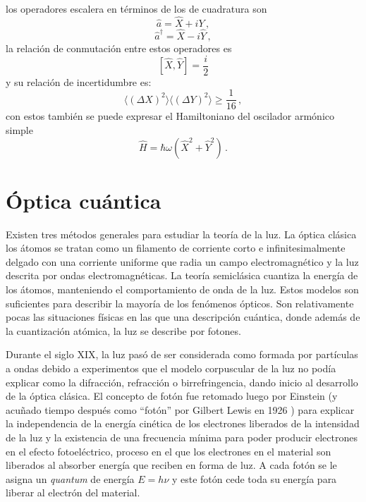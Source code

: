 los operadores escalera en términos de los de cuadratura son
\begin{equation}
  \label{OA.25}
  \hat{a} = \hat{X} + i{Y}\,,
\end{equation}
\begin{equation}
  \label{OA.26}
  \hat{a}^{\dagger} = \hat{X} - i\hat{Y}\,,
\end{equation}
la relación de conmutación entre estos operadores es
\begin{equation}
  \label{OA.27}
  \left[ \hat{X}, \hat{Y} \right] = \frac{i}{2}
\end{equation}
y su relación de incertidumbre es:
\begin{equation}
  \label{OA.28}
  \langle (\Delta X)^2 \rangle \langle (\Delta Y)^2 \rangle \geq \frac{1}{16}\,,
\end{equation}
con estos también se puede expresar el Hamiltoniano del oscilador armónico simple
\begin{equation}
  \label{OA.29}
  \hat{H} = \hbar \omega \left( \hat{X}^2 + \hat{Y}^2 \right)\,.
\end{equation}
\section{Óptica cuántica}
Existen tres métodos generales para estudiar la teoría de la luz. La óptica clásica los átomos se tratan como un filamento de corriente corto e infinitesimalmente delgado con una corriente uniforme que radia un campo electromagnético y la luz descrita por ondas electromagnéticas. La teoría semiclásica cuantiza la energía de los átomos, manteniendo el comportamiento de onda de la luz. Estos modelos son suficientes para describir la mayoría de los fenómenos ópticos. Son relativamente pocas las situaciones físicas en las que una descripción cuántica, donde además de la cuantización atómica, la luz se describe por fotones.

Durante el siglo XIX, la luz pasó de ser considerada como formada por partículas a ondas debido a experimentos que el modelo corpuscular de la luz no podía explicar como la difracción, refracción o birrefringencia, dando inicio al desarrollo de la óptica clásica. El concepto de fotón fue retomado luego por Einstein (y acuñado tiempo después como ``fotón'' por Gilbert Lewis en 1926 \cite{Fox}) para explicar la independencia de la energía cinética de los electrones liberados de la intensidad de la luz y la existencia de una frecuencia mínima para poder producir electrones en el efecto fotoeléctrico, proceso en el que los electrones en el material son liberados al absorber energía que reciben en forma de luz. A cada fotón se le asigna un \textit{quantum} de energía $E=h \nu$ y este fotón cede toda su energía para liberar al electrón del material.

